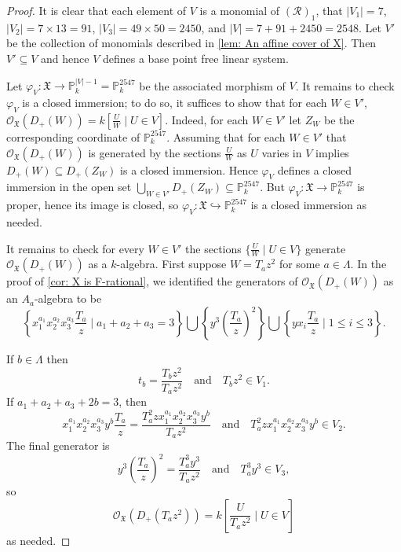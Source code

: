 \documentclass[reqno,11pt]{amsart}
\numberwithin{equation}{section}
\theoremstyle{definition}
\theoremstyle{definition}
\theoremstyle{definition}
\theoremstyle{remark}
\newcommand{\PP}{\mathbb{P}}
\newcommand{\cO}{\mathcal{O}}
\begin{document}
\begin{proof}
    It is clear that each element of $V$ is a monomial of $\left(\mathcal{R}\right)_1$, that $|V_1|=7$, $|V_2| = 7\times13=91$, $|V_3| = 49\times50 = 2450$, and $|V| = 7+91+2450 = 2548$. Let $V'$ be the collection of monomials described in \cref{lem: An affine cover of X}. Then $V'\subseteq V$ and hence $V$ defines a base point free linear system. 

    Let $\varphi_V:\mathfrak{X}\to \PP^{|V|-1}_k = \PP^{2547}_k$ be the associated morphism of $V$. It remains to check $\varphi_V$ is a closed immersion; to do so, it suffices to show that for each $W\in V'$, $\mathcal{O}_\mathfrak{X}(D_+(W)) = k\left[\frac{U}{W}\mid U\in V\right]$. Indeed, for each $W\in V'$ let $Z_W$ be the corresponding coordinate of $\PP^{2547}_k$. Assuming that for each $W\in V'$ that $\mathcal{O}_\mathfrak{X}(D_+(W))$ is generated by the sections $\frac{U}{W}$ as $U$ varies in $V$ implies $D_+(W)\subseteq D_+(Z_W)$ is a closed immersion. Hence $\varphi_V$ defines a closed immersion in the open set $\bigcup_{W\in V'}D_+(Z_W)\subseteq \PP^{2547}_k$. But $\varphi_V:\mathfrak{X}\to \PP^{2547}_k$ is proper, hence its image is closed, so $\varphi_V:\mathfrak{X}\hookrightarrow \PP^{2547}_k$ is a closed immersion as needed.

    It remains to check for every $W\in V'$ the sections $\{\frac{U}{W}\mid U\in V\}$ generate $\cO_{\mathfrak{X}}(D_+(W))$ as a $k$-algebra. First suppose $W = T_az^2$ for some $a\in\Lambda$. In the proof of \cref{cor: X is F-rational}, we identified the generators of $\cO_{\mathfrak{X}}(D_+(W))$ as an $A_a$-algebra to be 
    \[
    \left\{x_1^{a_1}x_2^{a_2}x_3^{a_3}\frac{T_a}{z}\mid a_1+a_2+a_3 = 3\right\} \bigcup \left\{y^3\left(\frac{T_a}{z}\right)^2\right\}\bigcup\left\{yx_i\frac{T_a}{z}\mid 1\leq i\leq 3\right\}.
    \]
    
    If $b\in\Lambda$ then
    \[
    t_b = \frac{T_bz^2}{T_az^2}\quad \mbox{and}\quad T_bz^2\in V_1.
    \]
    If $a_1+a_2+a_3 +2b = 3$, then 
    \[
    x_1^{a_1}x_2^{a_2}x_3^{a_3}y^b\frac{T_a}{z} = \frac{T_a^2zx_1^{a_1}x_2^{a_2}x_3^{a_3}y^b}{T_az^2} \quad \mbox{and}\quad T_a^2zx_1^{a_1}x_2^{a_2}x_3^{a_3}y^b\in V_2.
    \]
    The final generator is
    \[
    y^3\left(\frac{T_a}{z}\right)^2=\frac{T_a^3y^3}{T_az^2}\quad\mbox{and}\quad T_a^3y^3\in V_3,
    \]
    so
    \[
    \cO_\mathfrak{X}(D_+(T_az^2)) = k\left[\frac{U}{T_az^2}\mid U\in V\right]
    \]
    as needed.


\end{proof}
\end{document}
